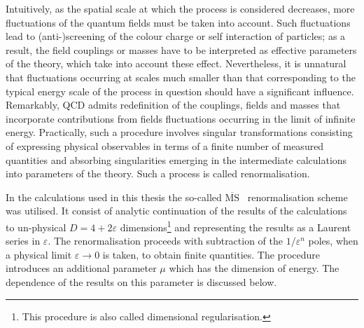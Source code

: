 Intuitively, as the spatial scale at which the process is considered decreases,  more fluctuations of the quantum fields must be taken into account. Such fluctuations lead to (anti-)screening of the colour charge or self interaction of particles; as a result, the field couplings or masses have to be interpreted as effective parameters of the theory, which take into account these effect. Nevertheless, it is unnatural that fluctuations occurring at scales much smaller than that corresponding to the typical energy scale of the process in question should have a significant influence. Remarkably, QCD admits redefinition of the couplings, fields and masses that incorporate contributions from fields fluctuations occurring in the limit of infinite energy. Practically, such a procedure involves singular transformations consisting of expressing physical observables in terms of a finite number of measured quantities and absorbing singularities emerging in the intermediate calculations into parameters of the theory. Such a process is called renormalisation. 

In the calculations used in this thesis the so-called $\overline{\mathrm{MS}}$~\cite{Bardeen:1978yd} renormalisation scheme was utilised. It consist of analytic continuation of the results of the calculations to un-physical $D=4+2\varepsilon$ dimensions\footnote{This procedure is also called dimensional regularisation.} and representing the results as a Laurent series in $\varepsilon$. The renormalisation proceeds with subtraction of the $1/\varepsilon^n$ poles, when a physical limit $\varepsilon \rightarrow 0$ is taken, to obtain finite quantities. The procedure introduces an additional parameter $\mu$ which has the dimension of energy. The dependence of the results on this parameter is discussed below.
